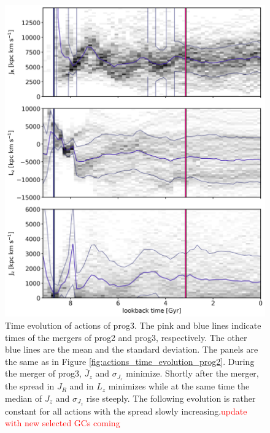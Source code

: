 \begin{figure}
\captionsetup{format=plain}
    \centering
	\includegraphics[width=\textwidth]{plots/Dynamics/prog3/action_time_evolution_hist_mean_prog3.png}
    \caption{Time evolution of actions of prog3. The pink and blue lines indicate times of the mergers of prog2 and prog3, respectively. The other blue lines are the mean and the standard deviation. The panels are the same as in Figure \ref{fig:actions_time_evolution_prog2}. During the merger of prog3, $\overline{J}_z$ and $\sigma{_J_z}$ minimize. Shortly after the merger, the spread in $J_R$ and in $L_z$ minimizes while at the same time the median of $J_z$ and $\sigma{_J_z}$ rise steeply. The following evolution is rather constant for all actions with the spread slowly increasing.\textcolor{red}{update with new selected GCs coming}}\label{fig:actions_time_evolution_prog3}
\end{figure}

